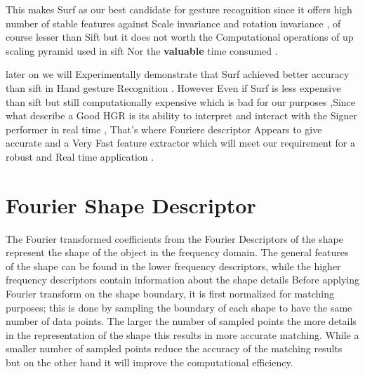 This makes Surf as our best candidate for gesture recognition  since it offers high number of stable features against Scale invariance and rotation invariance , of course lesser than Sift but it does not worth the Computational operations of up scaling pyramid used in sift Nor the \textbf{valuable }time consumed .

later on we will Experimentally demonstrate that Surf achieved  better accuracy than sift in Hand gesture Recognition  . However Even if Surf is less expensive than sift but still computationally expensive which is bad for our purposes ,Since what describe a Good HGR is its ability to interpret  and interact with the Signer performer in real time , That's where Fouriere descriptor Appears to give accurate and a Very Fast feature extractor which will meet our requirement for a robust and Real time application  .


\section{Fourier Shape Descriptor } \label{FDT}
The Fourier transformed coefficients from the Fourier
Descriptors of the shape represent the shape of the object in
the frequency domain. The general features of the shape can
be found in the lower frequency descriptors, while the higher
frequency descriptors contain information about the shape
details \cite{20}
Before applying Fourier transform on the shape boundary, it
is first normalized for matching purposes; this is done by
sampling the boundary of each shape to have the same number
of data points. The larger the number of sampled points the
more details in the representation of the shape this results in
more accurate matching. While a smaller number of sampled
points reduce the accuracy of the matching results but on the
other hand it will improve the computational efficiency. \\

